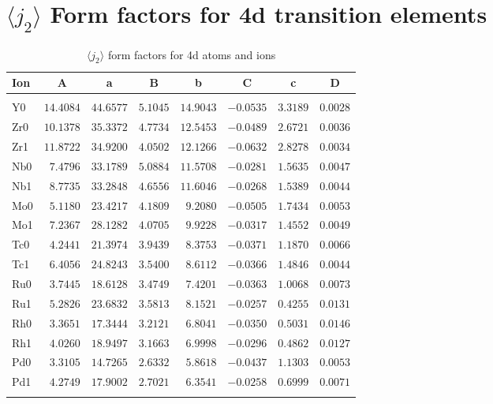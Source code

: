 \section{{\large $\langle j_2\rangle$} Form factors for 4d transition elements}
\begin{table}[H]
\caption{$\langle j_2\rangle$ form factors for 4d atoms and ions}\vspace{2mm}
\label{4dj2}
{\tablesize
\begin{tabular}{lrrrrrrr}
\hline
Ion&
\multicolumn{1}{c}{A}&\multicolumn{1}{c}{a}&
\multicolumn{1}{c}{B}&\multicolumn{1}{c}{b}&
\multicolumn{1}{c}{C}&\multicolumn{1}{c}{c}&\multicolumn{1}{c}{D}\\
\hline\\[-2ex]
Y0 &$14.4084$ &$44.6577$ &$5.1045$ &$14.9043$ &$-0.0535$ &$3.3189$ &$0.0028$ \\
Zr0 &$10.1378$ &$35.3372$ &$4.7734$ &$12.5453$ &$-0.0489$ &$2.6721$ &$0.0036$ \\
Zr1 &$11.8722$ &$34.9200$ &$4.0502$ &$12.1266$ &$-0.0632$ &$2.8278$ &$0.0034$ \\
Nb0 &$7.4796$ &$33.1789$ &$5.0884$ &$11.5708$ &$-0.0281$ &$1.5635$ &$0.0047$ \\
Nb1 &$8.7735$ &$33.2848$ &$4.6556$ &$11.6046$ &$-0.0268$ &$1.5389$ &$0.0044$ \\
Mo0 &$5.1180$ &$23.4217$ &$4.1809$ &$9.2080$ &$-0.0505$ &$1.7434$ &$0.0053$ \\
Mo1 &$7.2367$ &$28.1282$ &$4.0705$ &$9.9228$ &$-0.0317$ &$1.4552$ &$0.0049$ \\
Tc0 &$4.2441$ &$21.3974$ &$3.9439$ &$8.3753$ &$-0.0371$ &$1.1870$ &$0.0066$ \\
Tc1 &$6.4056$ &$24.8243$ &$3.5400$ &$8.6112$ &$-0.0366$ &$1.4846$ &$0.0044$ \\
Ru0 &$3.7445$ &$18.6128$ &$3.4749$ &$7.4201$ &$-0.0363$ &$1.0068$ &$0.0073$ \\
Ru1 &$5.2826$ &$23.6832$ &$3.5813$ &$8.1521$ &$-0.0257$ &$0.4255$ &$0.0131$ \\
Rh0 &$3.3651$ &$17.3444$ &$3.2121$ &$6.8041$ &$-0.0350$ &$0.5031$ &$0.0146$ \\
Rh1 &$4.0260$ &$18.9497$ &$3.1663$ &$6.9998$ &$-0.0296$ &$0.4862$ &$0.0127$ \\
Pd0 &$3.3105$ &$14.7265$ &$2.6332$ &$5.8618$ &$-0.0437$ &$1.1303$ &$0.0053$ \\
Pd1 &$4.2749$ &$17.9002$ &$2.7021$ &$6.3541$ &$-0.0258$ &$0.6999$ &$0.0071$ \\
\hline\\[-2ex]
\end{tabular}
}
\end{table}

